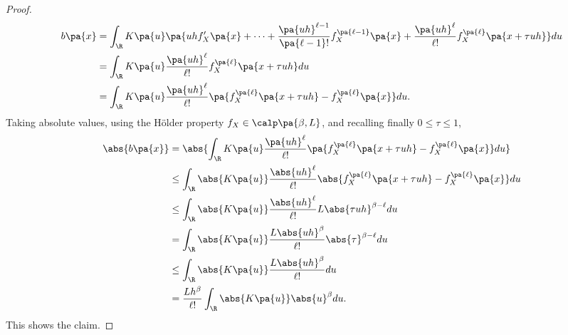 \begin{proof}
\begin{equation}
\begin{split}
    b\pa{x} &= \int_\R K\pa{u} \pa{uh f_X'\pa{x} + \cdots  + \frac{\pa{uh}^{\ell -1}}{\pa{\ell -1}!} f_X^{\pa{\ell -1}}\pa{x}+ \frac{\pa{uh}^\ell}{\ell !}f_X^{\pa{\ell}}\pa{x+\tau uh }} du\\
    &= \int_\R K\pa{u} \frac{\pa{uh}^\ell}{\ell !}f_X^{\pa{\ell}}\pa{x+\tau uh } du \\
    &= \int_\R K\pa{u} \frac{\pa{uh}^\ell}{\ell !} \pa{ f_X^{\pa{\ell}}\pa{x+\tau uh } - f_X^{\pa{\ell}}\pa{x}} du.
    \end{split}
  \end{equation}
  Taking absolute values, using the Hölder property $f_X\in \calp\pa{\beta, L}$, and recalling finally $0\leq \tau \leq 1$,
  \begin{equation}
    \begin{split}
      \abs{b\pa{x}} &= \abs{\int_\R K\pa{u} \frac{\pa{uh}^\ell}{\ell !} \pa{ f_X^{\pa{\ell}}\pa{x+\tau uh } - f_X^{\pa{\ell}}\pa{x}} du} \\
      &\leq \int_\R \abs{K\pa{u}} \frac{\abs{uh}^\ell}{\ell !} \abs{ f_X^{\pa{\ell}}\pa{x+\tau uh } - f_X^{\pa{\ell}}\pa{x}} du \\
      &\leq \int_\R \abs{K\pa{u}} \frac{\abs{uh}^\ell}{\ell !} L\abs{\tau u h}^{\beta - \ell} du \\
      &= \int_\R \abs{K\pa{u}}  \frac{L\abs{uh}^{\beta}}{\ell !} \abs{\tau}^{\beta - \ell} du \\
      &\leq  \int_\R \abs{K\pa{u}}  \frac{L\abs{uh}^{\beta}}{\ell !} du \\
      &= \frac{L h^\beta}{\ell !}\int_\R \abs{K\pa{u}}\abs{u}^{\beta} du.   \end{split}
  \end{equation}
  This shows the claim.
\end{proof}
